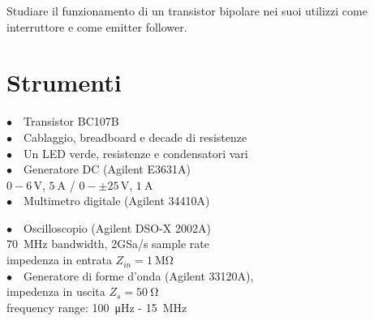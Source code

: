 Studiare il funzionamento di un transistor bipolare nei suoi utilizzi come interruttore %
e come emitter follower.%

\section{Strumenti}
%
\noindent
\begin{minipage}{.5\linewidth}
$\bullet \quad$Transistor BC107B\\
$\bullet \quad$Cablaggio, breadboard e decade di resistenze\\
$\bullet \quad$Un LED verde, resistenze e condensatori vari\\
$\bullet \quad$Generatore DC (Agilent E3631A)\\
\phantom{xxxx}$0-6\,\si{\volt}$, $\SI{5}{\ampere}$ / $0-\pm25\,\si{\volt}$, $\SI{1}{\ampere}$\\
$\bullet \quad$Multimetro digitale (Agilent 34410A)\\
\end{minipage}%
\begin{minipage}{.5\linewidth}
$\bullet \quad$Oscilloscopio (Agilent DSO-X 2002A)\\
\phantom{xxxx}\SI{70}{\mega\hertz} bandwidth, 2GSa/s sample rate\\
\phantom{xxxx}impedenza in entrata $Z_{in}=\SI{1}{\mega\ohm}$\\
$\bullet \quad$Generatore di forme d'onda (Agilent 33120A),\\
\phantom{xxxx}impedenza in uscita $Z_s=\SI{50}{\ohm}$\\
\phantom{xxxx}frequency range: \SI{100}{\micro\hertz} - \SI{15}{\mega\hertz}\\
\end{minipage}